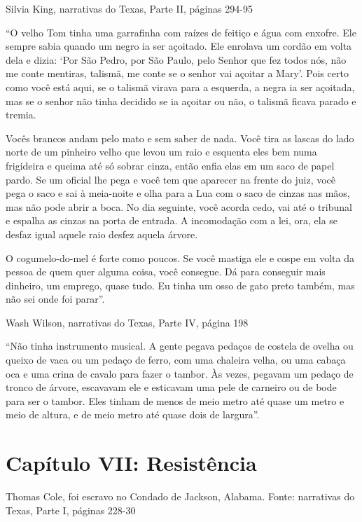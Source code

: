 Silvia King, narrativas do Texas, Parte II, páginas 294-95

``O velho Tom tinha uma garrafinha com raízes de feitiço e água com
enxofre. Ele sempre sabia quando um negro ia ser açoitado. Ele enrolava
um cordão em volta dela e dizia: `Por São Pedro, por São Paulo, pelo
Senhor que fez todos nós, não me conte mentiras, talismã, me conte se o
senhor vai açoitar a Mary'. Pois certo como você está aqui, se o talismã
virava para a esquerda, a negra ia ser açoitada, mas se o senhor não
tinha decidido se ia açoitar ou não, o talismã ficava parado e tremia.

Vocês brancos andam pelo mato e sem saber de nada. Você tira as lascas
do lado norte de um pinheiro velho que levou um raio e esquenta eles bem
numa frigideira e queima até só sobrar cinza, então enfia elas em um
saco de papel pardo. Se um oficial lhe pega e você tem que aparecer na
frente do juiz, você pega o saco e sai à meia-noite e olha para a Lua
com o saco de cinzas nas mãos, mas não pode abrir a boca. No dia
seguinte, você acorda cedo, vai até o tribunal e espalha as cinzas na
porta de entrada. A incomodação com a lei, ora, ela se desfaz igual
aquele raio desfez aquela árvore.

O cogumelo-do-mel é forte como poucos. Se você mastiga ele e cospe em
volta da pessoa de quem quer alguma coisa, você consegue. Dá para
conseguir mais dinheiro, um emprego, quase tudo. Eu tinha um osso de
gato preto também, mas não sei onde foi parar''.

Wash Wilson, narrativas do Texas, Parte IV, página 198

``Não tinha instrumento musical. A gente pegava pedaços de costela de
ovelha ou queixo de vaca ou um pedaço de ferro, com uma chaleira velha,
ou uma cabaça oca e uma crina de cavalo para fazer o tambor. Às vezes,
pegavam um pedaço de tronco de árvore, escavavam ele e esticavam uma
pele de carneiro ou de bode para ser o tambor. Eles tinham de menos de
meio metro até quase um metro e meio de altura, e de meio metro até
quase dois de largura''.

\chapter{Capítulo VII: Resistência}

Thomas Cole, foi escravo no Condado de Jackson, Alabama. Fonte:
narrativas do Texas, Parte I, páginas 228-30

